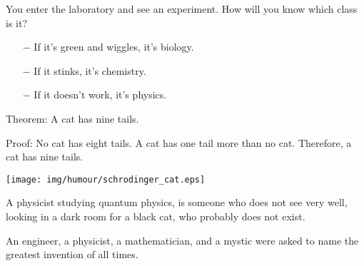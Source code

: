 	You enter the laboratory and see an experiment. How will you know which class is it?
	
	\begin{itemize}	 
		\item[$-$] If it's green and wiggles, it's biology.
	
		\item[$-$] If it stinks, it's chemistry.
	
		\item[$-$] If it doesn't work, it's physics.
	\end{itemize}
	
	\begin{center}\underline{\hspace{5 cm}}\end{center}	

	Theorem: A cat has nine tails.
	
	Proof: No cat has eight tails. A cat has one tail more than no cat. Therefore, a cat has nine tails.
	
	\begin{center}\underline{\hspace{5 cm}}\end{center}

	\begin{center}
	\texttt{[image: img/humour/schrodinger\_cat.eps]}
	\end{center}
	
	\begin{center}\underline{\hspace{5 cm}}\end{center}

	A physicist studying quantum physics, is someone who does not see very well, looking in a dark room for a black cat, who probably does not exist.
	
	\begin{center}\underline{\hspace{5 cm}}\end{center}

	An engineer, a physicist, a mathematician, and a mystic were asked to name the greatest invention of all times. 


